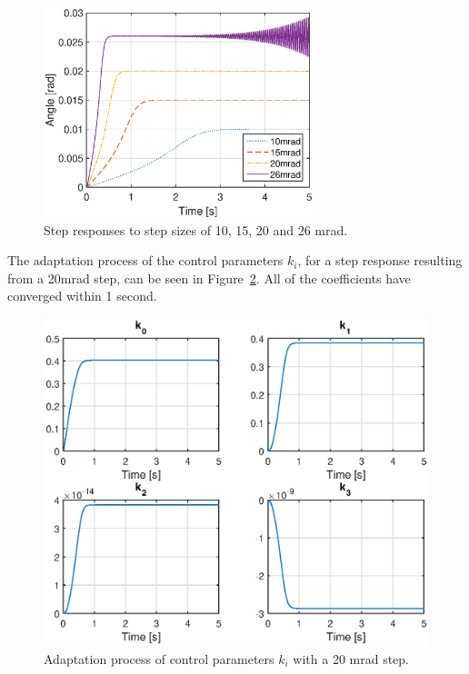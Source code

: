 \begin{figure}[h!]
  \centering
  \includegraphics[width=0.7\textwidth]{fig/matlab/stepresponse.eps}
  \caption{\label{fig:step_adaptive} Step responses to step sizes of 10, 15, 20 and 26 mrad.}
\end{figure}

The adaptation process of the control parameters $k_i$, for a step response resulting from a 20mrad step, can be seen in Figure~\ref{fig:adapt_process}. All of the coefficients have converged within 1 second.

\begin{figure}[h!]
  \centering
  \includegraphics[width=1\textwidth]{fig/matlab/k.eps}
  \caption{\label{fig:adapt_process} Adaptation process of control parameters $k_i$ with a 20 mrad step.}
\end{figure}

